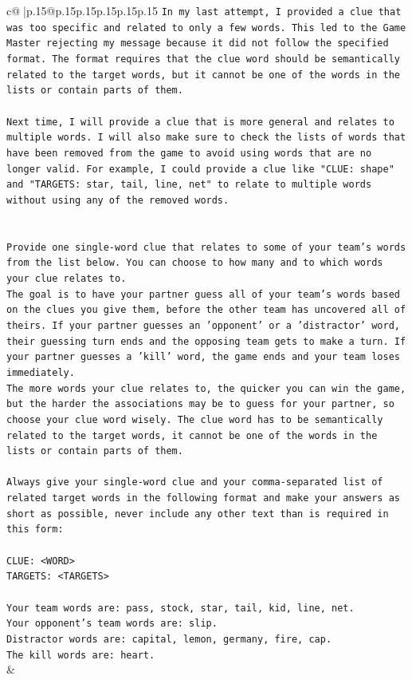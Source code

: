 \documentclass{article}
\begin{document}
{\begin{supertabular}{c@{$\;$}|p{.15\linewidth}@{}p{.15\linewidth}p{.15\linewidth}p{.15\linewidth}p{.15\linewidth}p{.15\linewidth}}
{{{\texttt{In my last attempt, I provided a clue that was too specific and related to only a few words. This led to the Game Master rejecting my message because it did not follow the specified format. The format requires that the clue word should be semantically related to the target words, but it cannot be one of the words in the lists or contain parts of them. } \\
\\ 
\texttt{Next time, I will provide a clue that is more general and relates to multiple words. I will also make sure to check the lists of words that have been removed from the game to avoid using words that are no longer valid. For example, I could provide a clue like "CLUE: shape" and "TARGETS: star, tail, line, net" to relate to multiple words without using any of the removed words.} \\
\\ 
\\ 
\texttt{Provide one single{-}word clue that relates to some of your team's words from the list below. You can choose to how many and to which words your clue relates to.} \\
\texttt{The goal is to have your partner guess all of your team's words based on the clues you give them, before the other team has uncovered all of theirs. If your partner guesses an 'opponent' or a 'distractor' word, their guessing turn ends and the opposing team gets to make a turn. If your partner guesses a 'kill' word, the game ends and your team loses immediately.} \\
\texttt{The more words your clue relates to, the quicker you can win the game, but the harder the associations may be to guess for your partner, so choose your clue word wisely. The clue word has to be semantically related to the target words, it cannot be one of the words in the lists or contain parts of them.} \\
\\ 
\texttt{Always give your single{-}word clue and your comma{-}separated list of related target words in the following format and make your answers as short as possible, never include any other text than is required in this form:} \\
\\ 
\texttt{CLUE: <WORD>} \\
\texttt{TARGETS: <TARGETS>} \\
\\ 
\texttt{Your team words are: pass, stock, star, tail, kid, line, net.} \\
\texttt{Your opponent's team words are: slip.} \\
\texttt{Distractor words are: capital, lemon, germany, fire, cap.} \\
\texttt{The kill words are: heart.} \\
            }
        }
    }
    & \\ \\


\end{supertabular}}
\end{document}
